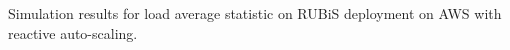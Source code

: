 \label{reactive} Simulation results for load average statistic on RUBiS deployment on AWS with reactive auto-scaling.